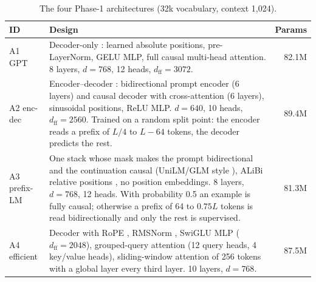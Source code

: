 \documentclass[11pt,a4paper]{article}
\begin{document}
\begin{table}[H]\centering\small
\caption{The four Phase-1 architectures (32k vocabulary, context 1{,}024).}\label{tab:arch}
\begin{tabularx}{\linewidth}{lXr}\toprule
ID & Design & Params\\\midrule
A1 GPT & Decoder-only \cite{radford2019gpt2}: learned absolute positions, pre-LayerNorm, GELU MLP, full causal
multi-head attention. 8 layers, $d=768$, 12 heads, $d_\text{ff}=3072$. & 82.1M\\
A2 enc-dec & Encoder--decoder \cite{vaswani2017attention}: bidirectional prompt encoder (6 layers) and causal
decoder with cross-attention (6 layers), sinusoidal positions, ReLU MLP. $d=640$, 10 heads,
$d_\text{ff}=2560$. Trained on a random split point: the encoder reads a prefix of $L/4$ to $L-64$
tokens, the decoder predicts the rest. & 89.4M\\
A3 prefix-LM & One stack whose mask makes the prompt bidirectional and the continuation causal
(UniLM/GLM style \cite{raffel2020t5}), ALiBi relative positions \cite{press2022alibi}, no position embeddings.
8 layers, $d=768$, 12 heads. With probability 0.5 an example is fully causal; otherwise a prefix of
64 to $0.75L$ tokens is read bidirectionally and only the rest is supervised. & 81.3M\\
A4 efficient & Decoder with RoPE \cite{su2021roformer}, RMSNorm \cite{zhang2019rmsnorm}, SwiGLU MLP
\cite{shazeer2020glu} ($d_\text{ff}=2048$), grouped-query attention \cite{ainslie2023gqa} (12 query heads,
4 key/value heads), sliding-window attention of 256 tokens \cite{beltagy2020longformer} with a global layer
every third layer. 10 layers, $d=768$. & 87.5M\\
\bottomrule\end{tabularx}\end{table}
\end{document}
